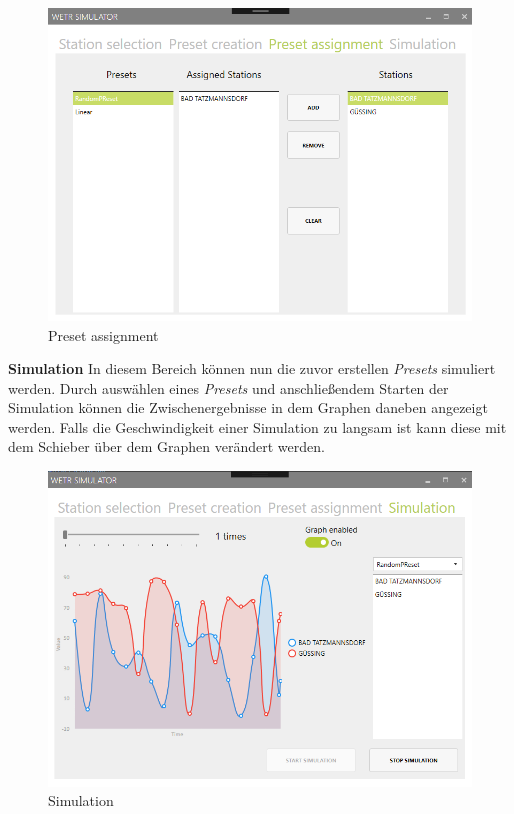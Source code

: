 \begin{figure}[H]
\centering
\includegraphics[width=.7\textwidth]{pictures/Simulator/Simulator_3_PresetAssignment.png}
\caption{Preset assignment}
\label{fig:Wetr.Simulator.Wpf.PresetAssignment}
\end{figure}
\raggedright

\textbf{Simulation}\newline
In diesem Bereich können nun die zuvor erstellen \textit{Presets} simuliert werden. Durch auswählen eines \textit{Presets} und anschließendem Starten der Simulation können die Zwischenergebnisse in dem Graphen daneben angezeigt werden. 
Falls die Geschwindigkeit einer Simulation zu langsam ist kann diese mit dem Schieber über dem Graphen verändert werden.

\begin{figure}[H]
\centering
\includegraphics[width=.7\textwidth]{pictures/Simulator/Simulator_4_Simulation.png}
\caption{Simulation}
\label{fig:Wetr.Simulator.Wpf.Simulation}
\end{figure}
\raggedright